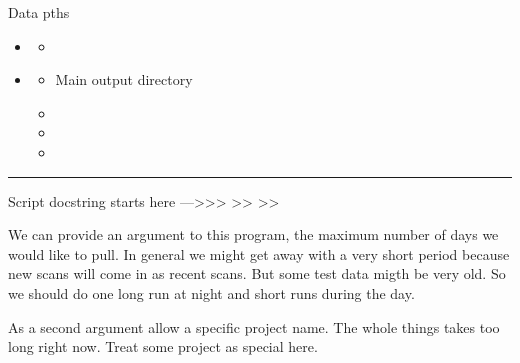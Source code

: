 \documentclass[letterpaper,10pt,english]{sphinxmanual}
\begin{document}
\sphinxAtStartPar
Data pths
\begin{itemize}
\item {} \begin{description}
\begin{itemize}
\item {} 
\sphinxAtStartPar
{}

\end{itemize}

\end{description}

\item {} \begin{description}
\begin{itemize}
\item {} 
\sphinxAtStartPar
{} \sphinxhyphen{} Main output directory

\item {} 
\sphinxAtStartPar
{}

\item {} 
\sphinxAtStartPar
{}

\item {} 
\sphinxAtStartPar
{}

\end{itemize}

\end{description}

\end{itemize}


\bigskip\hrule\bigskip


\sphinxAtStartPar
Script docstring starts here —\textgreater{}\textgreater{}\textgreater{}
\textendash{}\textgreater{}\textgreater{}
\textendash{}\textgreater{}\textgreater{}

\sphinxAtStartPar
We can provide an argument to this program, the maximum number of days we would like to pull. In general we might get away with a very short
period because new scans will come in as recent scans. But some test data migth be very old. So we should do one long run at night and short
runs during the day.

\sphinxAtStartPar
As a second argument allow a specific project name. The whole things takes too long right now. Treat some project as special here.
\end{document}
